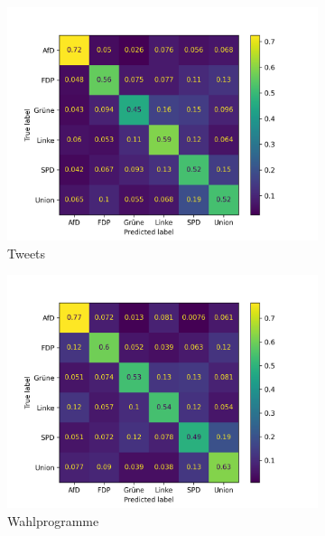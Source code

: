 \begin{figure}[H]
  \centering
  \begin{subfigure}{0.49\textwidth}
    \includegraphics[width=\textwidth]{data/images/modeling/bert/under/tweets_confusion_matrix.png}
    \caption{Tweets} \label{sfig:confusionMatrixBertTweets}
  \end{subfigure}
  \hfill
  \begin{subfigure}{0.49\textwidth}
    \includegraphics[width=\textwidth]{data/images/modeling/bert/under/party_programs_confusion_matrix.png}
    \caption{Wahlprogramme} \label{sfig:confusionMatrixBertManifest}
  \end{subfigure}
  \hfill
  \begin{subfigure}{0.49\textwidth}

\end{subfigure}
\end{figure}
